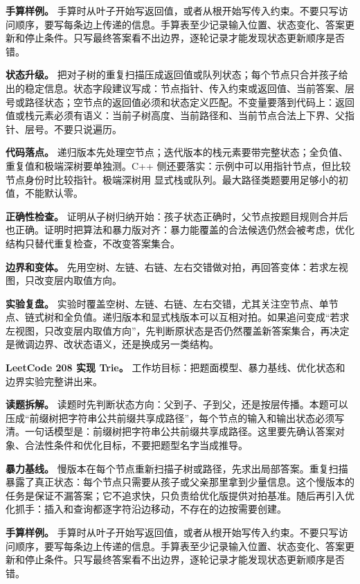 \textbf{手算样例。} 手算时从叶子开始写返回值，或者从根开始写传入约束。不要只写访问顺序，要写每条边上传递的信息。手算表至少记录输入位置、状态变化、答案更新和停止条件。只写最终答案看不出边界，逐轮记录才能发现状态更新顺序是否错。

\textbf{状态升级。} 把对子树的重复扫描压成返回值或队列状态；每个节点只合并孩子给出的稳定信息。状态字段建议写成：节点指针、传入约束或返回值、当前答案、层号或路径状态；空节点的返回值必须和状态定义匹配。不变量要落到代码上：返回值或栈元素必须有语义：当前子树高度、当前路径和、当前节点合法上下界、父指针、层号。不要只说遍历。

\textbf{代码落点。} 递归版本先处理空节点；迭代版本的栈元素要带完整状态；全负值、重复值和极端深树要单独测。C++ 侧还要落实：示例中可以用指针节点，但比较节点身份时比较指针。极端深树用  显式栈或队列。最大路径类题要用足够小的初值，不能默认零。

\textbf{正确性检查。} 证明从子树归纳开始：孩子状态正确时，父节点按题目规则合并后也正确。证明时把算法和暴力版对齐：暴力能覆盖的合法候选仍然会被考虑，优化结构只替代重复检查，不改变答案集合。

\textbf{边界和变体。} 先用空树、左链、右链、左右交错做对拍，再回答变体：若求左视图，只改变层内取值方向。

\textbf{实验复盘。} 实验时覆盖空树、左链、右链、左右交错，尤其关注空节点、单节点、链式树和全负值。递归版本和显式栈版本可以互相对拍。如果追问变成“若求左视图，只改变层内取值方向”，先判断原状态是否仍然覆盖新答案集合，再决定是微调边界、改状态语义，还是换成另一类结构。

\noindent\textbf{LeetCode 208 实现 Trie。} 工作坊目标：把题面模型、暴力基线、优化状态和边界实验完整讲出来。

\textbf{读题拆解。} 读题时先判断状态方向：父到子、子到父，还是按层传播。本题可以压成“前缀树把字符串公共前缀共享成路径”，每个节点的输入和输出状态必须写清。一句话模型是：前缀树把字符串公共前缀共享成路径。这里要先确认答案对象、合法性条件和优化目标，不要把题型名字当成推导。

\textbf{暴力基线。} 慢版本在每个节点重新扫描子树或路径，先求出局部答案。重复扫描暴露了真正状态：每个节点只需要从孩子或父亲那里拿到少量信息。这个慢版本的任务是保证不漏答案；它不追求快，只负责给优化版提供对拍基准。随后再引入优化抓手：插入和查询都逐字符沿边移动，不存在的边按需要创建。

\textbf{手算样例。} 手算时从叶子开始写返回值，或者从根开始写传入约束。不要只写访问顺序，要写每条边上传递的信息。手算表至少记录输入位置、状态变化、答案更新和停止条件。只写最终答案看不出边界，逐轮记录才能发现状态更新顺序是否错。

